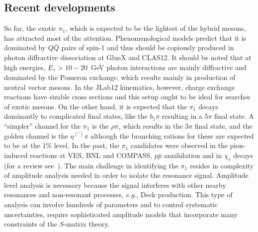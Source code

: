 \subsection{Recent developments}
\label{sec:spectdev}
So far, the exotic $\pi_1$, which is expected to be the lightest of the hybrid mesons, has attracted most of the attention. Phenomenological models predict that it is dominated by $Q\bar Q$ pairs of spin-1 and thus should be copiously produced in photon diffractive dissociation at GlueX and CLAS12. It should be noted that at high energies, $E_\gamma > 10-20$~GeV photon interactions are mainly diffractive and dominated by the Pomeron exchange, which results mainly in production of neutral vector mesons.  In the JLab12 kinematics, however,  charge exchange reactions  have sizable cross sections and this setup ought to be ideal for searches of exotic mesons.  On the other hand, it is expected that the $\pi_1$ decays dominantly to complicated final states, like the $ b_1 \pi$ resulting in a $5\pi$ final state.  A “simpler” channel for the $\pi_1$ is the $\rho\pi$, which results in the $3\pi$ final state, and the golden channel is the $\eta^{(')}\pi$ although the branching rations for these are expected to be at the $1\%$ level.  In the past, the $\pi_1$ candidates were observed in the pion-induced reactions at VES, BNL and COMPASS, $p\bar p$ annihilation and in $\chi_c$ decays (for a review see~\cite{Meyer:2015eta}).  The main challenge in identifying the $\pi_1$ resides in complexity of amplitude analysis needed in order to isolate the resonance signal. Amplitude level analysis is necessary because the signal interferes with other nearby resonances and non-resonant processes, \textit{e.g.}, Deck production. This type of analysis can involve hundreds of parameters and to control systematic uncertainties, require sophisticated amplitude models that incorporate many constraints of the $S$-matrix theory. 
 
